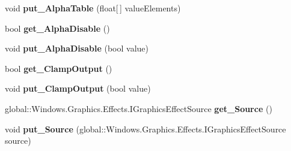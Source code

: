 \begin{DoxyCompactItemize}
\item 
\mbox{\label{class_microsoft_1_1_graphics_1_1_canvas_1_1_effects_1_1_discrete_transfer_effect_addfe9d035daca75cff393694be2f3c6c}} 
void {\bfseries put\+\_\+\+Alpha\+Table} (float\mbox{[}$\,$\mbox{]} value\+Elements)
\item 
\mbox{\label{class_microsoft_1_1_graphics_1_1_canvas_1_1_effects_1_1_discrete_transfer_effect_afae99fede3fb23deb7b337207d109d10}} 
bool {\bfseries get\+\_\+\+Alpha\+Disable} ()
\item 
\mbox{\label{class_microsoft_1_1_graphics_1_1_canvas_1_1_effects_1_1_discrete_transfer_effect_a99c4ded96e00c754eb5dedef880e7af2}} 
void {\bfseries put\+\_\+\+Alpha\+Disable} (bool value)
\item 
\mbox{\label{class_microsoft_1_1_graphics_1_1_canvas_1_1_effects_1_1_discrete_transfer_effect_a6c4b3ec17b2dba47834aa74cd044058a}} 
bool {\bfseries get\+\_\+\+Clamp\+Output} ()
\item 
\mbox{\label{class_microsoft_1_1_graphics_1_1_canvas_1_1_effects_1_1_discrete_transfer_effect_ac8ea83113fe2b3a628baec70125ead0c}} 
void {\bfseries put\+\_\+\+Clamp\+Output} (bool value)
\item 
\mbox{\label{class_microsoft_1_1_graphics_1_1_canvas_1_1_effects_1_1_discrete_transfer_effect_a5190652a2bb2f5670054722c336d45c2}} 
global\+::\+Windows.\+Graphics.\+Effects.\+I\+Graphics\+Effect\+Source {\bfseries get\+\_\+\+Source} ()
\item 
\mbox{\label{class_microsoft_1_1_graphics_1_1_canvas_1_1_effects_1_1_discrete_transfer_effect_ad2e354fa5591b5b28f5c19e4c0c8a0ca}} 
void {\bfseries put\+\_\+\+Source} (global\+::\+Windows.\+Graphics.\+Effects.\+I\+Graphics\+Effect\+Source source)

\end{DoxyCompactItemize}
